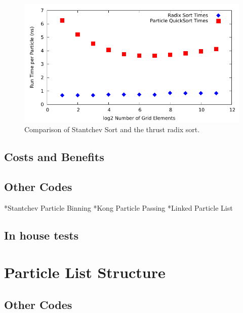 \begin{figure}
\begin{center}
\includegraphics[width=5in]{design/sort_compare.pdf}
\end{center}
\caption{Comparison of Stantchev Sort and the thrust radix sort.}
\label{fig:stantchev_sort_compare}
\end{figure}

		\subsection{Costs and Benefits}
		\subsection{Other Codes}
		*Stantchev Particle Binning
		*Kong Particle Passing
		*Linked Particle List
		\subsection{In house tests}

	\section{Particle List Structure}
	
		\subsection{Other Codes}

